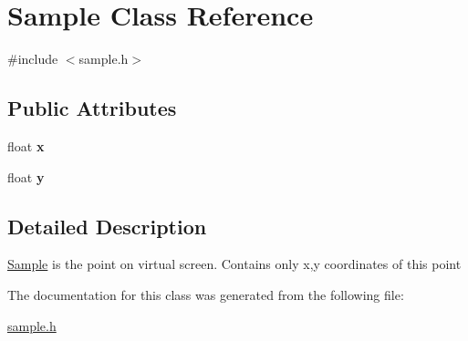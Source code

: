\hypertarget{class_sample}{}\section{Sample Class Reference}
\label{class_sample}


{\ttfamily \#include $<$sample.\+h$>$}

\subsection*{Public Attributes}
\begin{DoxyCompactItemize}
\item 
\mbox{\label{class_sample_ab1a2036e1dfe0e5e72b50d57e0c0881a}} 
float {\bfseries x}
\item 
\mbox{\label{class_sample_aa187ba2938ab0105050bc859dcc03a1f}} 
float {\bfseries y}
\end{DoxyCompactItemize}


\subsection{Detailed Description}
\mbox{\hyperlink{class_sample}{Sample}} is the point on virtual screen. Contains only x,y coordinates of this point 

The documentation for this class was generated from the following file\+:\begin{DoxyCompactItemize}
\item 
\mbox{\hyperlink{sample_8h}{sample.\+h}}\end{DoxyCompactItemize}
